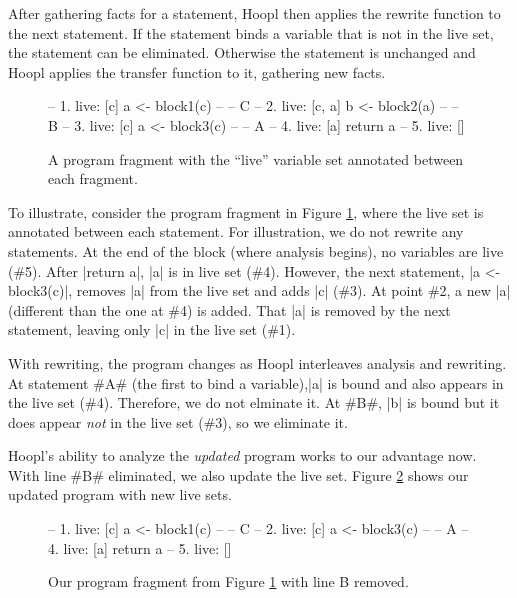 \documentclass[12pt]{report}
\begin{document}
After gathering facts for a statement, Hoopl then applies the rewrite
function to the next statement. If the statement binds a variable that
is not in the live set, the statement can be eliminated. Otherwise the
statement is unchanged and Hoopl applies the transfer function to it,
gathering new facts.


\begin{figure}[b]
  \begin{code}
    --  1. live: [c] 
    a <- block1(c) -- -- C
    --  2. live: [c, a]
    b <- block2(a) -- -- B
    --  3. live: [c]
    a <- block3(c) -- -- A
    --  4. live: [a] 
    return a 
    --  5. live: []
  \end{code}
  \caption{A program fragment with the ``live'' variable set annotated between each fragment.}
  \label{fig_dead1}
\end{figure}

To illustrate, consider the program fragment in Figure
\ref{fig_dead1}, where the live set is annotated between each
statement. For illustration, we do not rewrite any statements.
At the end of the block (where analysis begins), no
variables are live (\#5). After |return a|, |a| is in live set
(\#4). However, the next statement, |a <- block3(c)|, removes
|a| from the live set and adds |c| (\#3). At point \#2, a new |a| (different than
the one at \#4) is added. That |a| is removed by the next statement, leaving 
only |c| in the live set (\#1). 

With rewriting, the program changes as Hoopl interleaves analysis and
rewriting. At statement #A# (the first to bind a variable),|a| is
bound and also appears in the live set (\#4). Therefore, we do not
elminate it. At #B#, |b| is bound but it does appear \emph{not} in the
live set (\#3), so we eliminate it. 

Hoopl's ability to analyze the \emph{updated} program works to our
advantage now. With line #B# eliminated, we also update the live
set. Figure \ref{fig_dead2} shows our updated program with new live
sets. 

\begin{figure}[h]
  \begin{code}
    --  1. live: [c] 
    a <- block1(c) -- -- C
    --  2. live: [c]
    a <- block3(c) -- -- A
    --  4. live: [a] 
    return a 
    --  5. live: []
  \end{code}
  \caption{Our program fragment from Figure \ref{fig_dead1} with line B removed.}
  \label{fig_dead2}
\end{figure}
\end{document}
